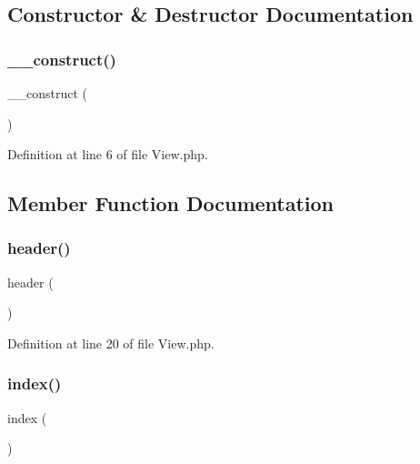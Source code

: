 \subsection{Constructor \& Destructor Documentation}
\mbox{\label{class_view_a095c5d389db211932136b53f25f39685}} 
\subsubsection{\texorpdfstring{\_\_construct()}{\_\_construct()}}
{\footnotesize\ttfamily \+\_\+\+\_\+construct (\begin{DoxyParamCaption}{ }\end{DoxyParamCaption})}



Definition at line 6 of file View.\+php.



\subsection{Member Function Documentation}
\mbox{\label{class_view_aafc568a720a06040aa70083c38435804}} 
\subsubsection{\texorpdfstring{header()}{header()}}
{\footnotesize\ttfamily header (\begin{DoxyParamCaption}{ }\end{DoxyParamCaption})}



Definition at line 20 of file View.\+php.

\mbox{\label{class_view_a149eb92716c1084a935e04a8d95f7347}} 
\subsubsection{\texorpdfstring{index()}{index()}}
{\footnotesize\ttfamily index (\begin{DoxyParamCaption}{ }\end{DoxyParamCaption})}



